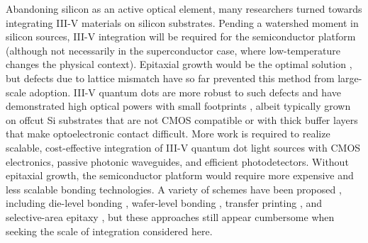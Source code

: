 \documentclass[twocolumn]{article}
\begin{document}
Abandoning silicon as an active optical element, many researchers turned towards integrating III-V materials on silicon substrates. Pending a watershed moment in silicon sources, III-V integration will be required for the semiconductor platform (although not necessarily in the superconductor case, where low-temperature changes the physical context). Epitaxial growth would be the optimal solution \cite{norman2018perspective}, but defects due to lattice mismatch have so far prevented this method from large-scale adoption. III-V quantum dots are more robust to such defects and have demonstrated high optical powers with small footprints \cite{chli2016,jung2017high, norman2018perspective}, albeit typically grown on offcut Si substrates that are not CMOS compatible or with thick buffer layers that make optoelectronic contact difficult. More work is required to realize scalable, cost-effective integration of III-V quantum dot light sources with CMOS electronics, passive photonic waveguides, and efficient photodetectors. Without epitaxial growth, the semiconductor platform would require more expensive and less scalable bonding technologies. A variety of schemes have been proposed \cite{norman2018perspective,tang2019integration}, including die-level bonding \cite{sost2016,crsa2017}, wafer-level bonding \cite{huli2019,szha2019,jito2020}, transfer printing \cite{jubo2012,zhha2018,zhang2019iii}, and selective-area epitaxy \cite{haxu2021}, but these approaches still appear cumbersome when seeking the scale of integration considered here.
\end{document}
